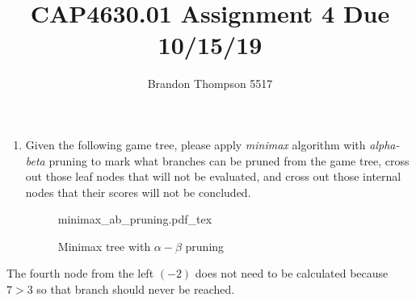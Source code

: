 \documentclass[a4paper]{article}
\newcommand{\incfig}[1]{%
	\def\svgwidth{\columnwidth}
	{#1.pdf_tex}
}
\begin{document}
	\title{CAP4630.01 Assignment 4 Due 10/15/19}
	\author{Brandon Thompson 5517}
	\maketitle

	\begin{enumerate}
		\item Given the following game tree, please apply \textit{minimax} algorithm with
			\textit{alpha-beta} pruning to mark what branches can be pruned from the
			game tree, cross out those leaf nodes that will not be evaluated, and
			cross out those internal nodes that their scores will not be concluded.
\begin{figure}[ht]
	\centering
	\incfig{minimax_ab_pruning}
	\caption{Minimax tree with $\alpha-\beta$ pruning}
	\label{fig:asdf}
\end{figure}	
	\end{enumerate}
	The fourth node from the left $\left( -2 \right) $ does not need to be calculated because
	$7 > 3$ so that branch should never be reached.
\end{document}
